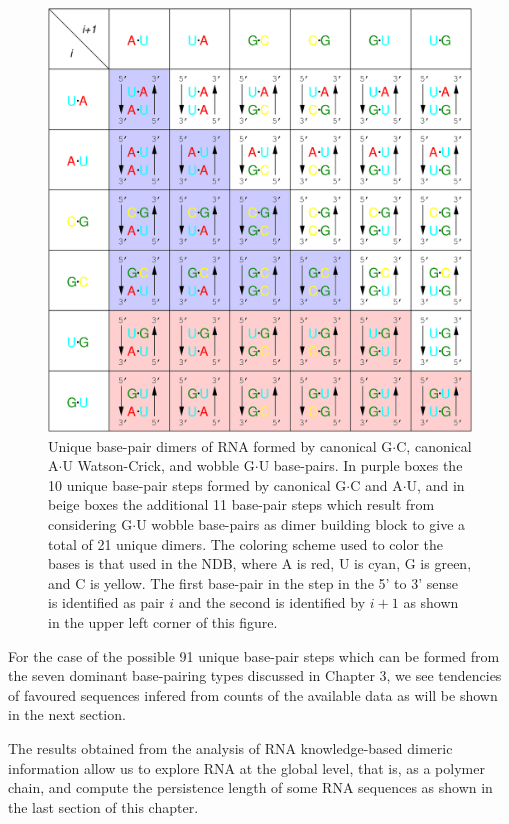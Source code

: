 \begin{figure}
\centering
\includegraphics[angle=0, scale=0.4]{Chapter4/unique.png}
\caption{Unique base-pair dimers of RNA formed by canonical G$\cdot$C,
  canonical    A$\cdot$U    Watson-Crick,    and   wobble    G$\cdot$U
  base-pairs.  In purple  boxes the  10 unique  base-pair steps
  formed  by canonical G$\cdot$C  and A$\cdot$U,  and in  beige boxes
  the  additional  11   base-pair  steps  which   result  from
  considering G$\cdot$U  wobble base-pairs as dimer  building block to
  give a total of 21 unique  dimers. The coloring scheme used to color
  the bases is that  used in the NDB, where A is red,  U is cyan, G is
  green, and C is yellow. The first  base-pair in the step in the 5' to
  3' sense is  identified as pair $i$ and the  second is identified by
  $i+1$ as shown in the upper left corner of this figure.}
\label{fig:unique}
\end{figure}  

For the  case of the possible  91 unique base-pair steps  which can be
formed from the seven  dominant base-pairing types discussed in Chapter
3,  we see tendencies of favoured sequences infered from counts of the
available data as will be shown in the next section. 

The results obtained from  the analysis of RNA knowledge-based dimeric
information allow us to explore RNA at the global level, that is, as a
polymer  chain,  and  compute  the  persistence  length  of  some  RNA
sequences as shown in the last section of this chapter.

